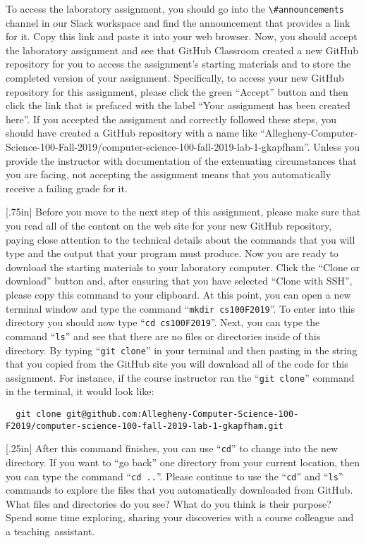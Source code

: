 \documentclass[11pt]{article}
\newcommand{\command}[1]{``\lstinline{#1}''}
\newcommand{\channel}[1]{\lstinline{#1}}
\newcommand{\step}[1]{``{#1}''}
\newcommand{\caution}[1]{\null\hfill\LARGE{\faWarning{}}\newline\scriptsize{\em{#1}}}
\newcommand{\discuss}[1]{\null\hfill\LARGE{\faCommentO{}}\newline\scriptsize{\em{#1}}}
\begin{document}
To access the laboratory assignment, you should go into the
\channel{\#announcements} channel in our Slack workspace and find the
announcement that provides a link for it. Copy this link and paste it into your
web browser. Now, you should accept the laboratory assignment and see that
GitHub Classroom created a new GitHub repository for you to access the
assignment's starting materials and to store the completed version of your
assignment. Specifically, to access your new GitHub repository for this
assignment, please click the green ``Accept'' button and then click the link
that is prefaced with the label ``Your assignment has been created here''. If
you accepted the assignment and correctly followed these steps, you should have
created a GitHub repository with a name like
``Allegheny-Computer-Science-100-Fall-2019/computer-science-100-fall-2019-lab-1-gkapfham''.
Unless you provide the instructor with documentation of the extenuating
circumstances that you are facing, not accepting the assignment means that you
automatically receive a failing grade for it.

\marginnote{\caution{Clone GitHub repository}}[.75in] Before you move to the
next step of this assignment, please make sure that you read all of the content
on the web site for your new GitHub repository, paying close attention to the
technical details about the commands that you will type and the output that
your program must produce. Now you are ready to download the starting materials
to your laboratory computer. Click the ``Clone or download'' button and, after
ensuring that you have selected ``Clone with SSH'', please copy this command to
your clipboard. At this point, you can open a new terminal window and type the
command \command{mkdir cs100F2019}. To enter into this directory you should now
type \command{cd cs100F2019}. Next, you can type the command \command{ls} and
see that there are no files or directories inside of this directory. By typing
\command{git clone} in your terminal and then pasting in the string that you
copied from the GitHub site you will download all of the code for this
assignment. For instance, if the course instructor ran the \command{git clone}
command in the terminal, it would look like:

\begin{lstlisting}
  git clone git@github.com:Allegheny-Computer-Science-100-F2019/computer-science-100-fall-2019-lab-1-gkapfham.git
\end{lstlisting}

\marginnote{\discuss{Use terminal commands}}[.25in] After this command
finishes, you can use \command{cd} to change into the new directory. If you
want to \step{go back} one directory from your current location, then you can
type the command \command{cd ..}. Please continue to use the \command{cd} and
\command{ls} commands to explore the files that you automatically downloaded
from GitHub. What files and directories do you see? What do you think is their
purpose? Spend some time exploring, sharing your discoveries with a course
colleague and a \mbox{teaching assistant}.
\end{document}
